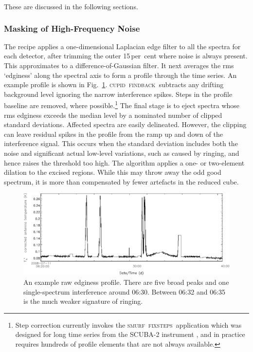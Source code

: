 \documentclass[a4paper,fleqn,usenatbib]{mnras}
\newcommand{\cupid}{\textsc{cupid}}
\newcommand{\smurf}{\textsc{smurf}}
\newcommand{\findback}{\textsc{findback}}
\newcommand{\fixsteps}{\textsc{fixsteps}}
\begin{document}
These are discussed in the following sections.

\subsubsection{Masking of High-Frequency Noise}

The recipe applies a one-dimensional Laplacian edge filter to all the
spectra for each detector, after trimming the outer 15\,per~cent where noise
is always present.  This approximates to a difference-of-Gaussian
filter.  It next averages the rms `edginess' along the spectral axis
to form a profile through the time series.  An example profile is
shown in Fig.~\ref{fig:badbase:raw_edginess_profile}.  \cupid\
\findback\ subtracts any drifting background level ignoring the narrow
interference spikes.  Steps in the profile baseline are removed, where
possible.\footnote{Step correction currently invokes the \smurf\ \fixsteps\
application which was designed for long time series from the SCUBA-2
instrument \citep{2013MNRAS.430.2545C}, and in practice
requires hundreds of profile elements that are not always available.}
The final stage is to eject spectra whose rms edginess exceeds the
median level by a nominated number of clipped standard deviations.
Affected spectra are easily delineated.  However, the clipping can
leave residual spikes in the profile from the ramp up and down of the
interference signal.  This occurs when the standard deviation includes
both the noise and significant actual low-level variations, such as
caused by ringing, and hence raises the threshold too high.  The
algorithm applies a one- or two-element dilation to the excised
regions.  While this may throw away the odd good spectrum, it is more
than compensated by fewer artefacts in the reduced cube.


\begin{figure}
\includegraphics[width=\textwidth]{raw_edginess_profile}
\caption{An example raw edginess profile.  There are five broad
  peaks and one single-spectrum interference around 06:30.  Between
  06:32 and 06:35 is the much weaker signature of ringing.}
\label{fig:badbase:raw_edginess_profile}
\end{figure}
\end{document}
